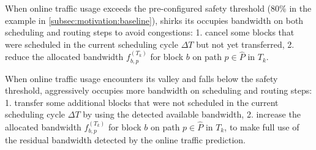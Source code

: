 {\begin{table}[t]
\begin{center}
\end{center}
\caption{}
\label{table:adjustment}
\end{table}

\begin{packeditemize}
\item When online traffic usage exceeds the pre-configured safety threshold (80\% in the example in \Section\ref{subsec:motivation:baseline}), \newname shirks its occupies bandwidth on both scheduling and routing steps to avoid congestions: 1. cancel some blocks that were scheduled in the current scheduling cycle $\Delta T$ but not yet transferred, 2. reduce the allocated bandwidth $f_{b,p}^{(T_k)}$ for block $b$ on path $p\in \hat{P}$ in $T_k$.

\item When online traffic usage encounters its valley and falls below the safety threshold, \newname aggressively occupies more bandwidth on scheduling and routing steps: 1. transfer some additional blocks that were not scheduled in the current scheduling cycle $\Delta T$ by using the detected available bandwidth, 2. increase the allocated bandwidth $f_{b,p}^{(T_k)}$ for block $b$ on path $p\in \hat{P}$ in $T_k$, to make full use of the residual bandwidth detected by the online traffic prediction.
\end{packeditemize}




}
